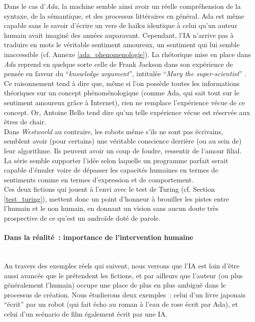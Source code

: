 \documentclass{article}
\newcommand{\subsubsubsection}[1]{\paragraph{#1}\mbox{}\\}
\begin{document}
					Dans le cas d'\textit{Ada}, la machine semble ainsi avoir un réelle compréhension de la syntaxe, de la sémantique, et des processus littéraires en général. Ada est même capable sans le savoir d'écrire un vers de haïku identique à celui qu'un auteur humain avait imaginé des années auparavant. Cependant, l'IA n'arrive pas à traduire en mots le véritable sentiment amoureux, un sentiment qui lui semble inaccessible (cf. Annexe \ref{ada_phenomenologie}). La rhétorique mise en place dans \textit{Ada} reprend en quelque sorte celle de Frank Jackson dans son expérience de pensée en faveur du ``\textit{knowledge argument}'', intitulée ``\textit{Mary the super-scientist}'' \cite{jackson1982}. Ce raisonnement tend à dire que, même si l'on possède toutes les informations théoriques sur un concept phénoménologique (comme Ada, qui sait tout sur le sentiment amoureux grâce à Internet), rien ne remplace l'expérience vécue de ce concept. Or, Antoine Bello tend dire qu'un telle expérience vécue est réservée aux êtres de chair.\\
					
					Dans \textit{Westworld} au contraire, les robots même s'ils ne sont pas écrivains, semblent avoir (pour certains) une véritable conscience derrière (ou au sein de) leur algorithme. Ils peuvent avoir un coup de foudre, ressentir de l'amour filial. La série semble supporter l'idée selon laquelle un programme parfait serait capable d'émuler voire de dépasser les capacités humaines en termes de sentiments comme en termes d'expression et de comportement.\\
					
					Ces deux fictions qui jouent à l'envi avec le test de Turing (cf. Section \ref{test_turing}), mettent donc un point d'honneur à brouiller les pistes entre l'humain et le non humain, en donnant un vision sans aucun doute très prospective de ce qu'est un androïde doté de parole.
					
					
					
				\subsubsubsection{Dans la réalité~: importance de l'intervention humaine}
					Au travers des exemples réels qui suivent, nous verrons que l'IA est loin d'être aussi avancée que le prétendent les fictions, et par ailleurs que l'auteur (ou plus généralement l'humain) occupe une place de plus en plus ambiguë dans le processus de création. Nous étudierons deux exemples~: celui d'un livre japonais ``écrit'' par un robot (qui fait écho au roman à l'eau de rose écrit par Ada), et celui d'un scénario de film également écrit par une IA.\\
					
\end{document}
